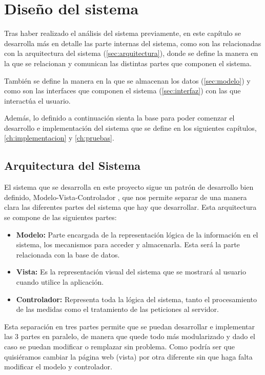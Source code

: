 \chapter{Diseño del sistema}
\label{ch:diseno}
Tras haber realizado el análisis del sistema previamente, en este capítulo se desarrolla más en detalle las parte internas del sistema, como son las relacionadas con la arquitectura del sistema (\autoref{sec:arquitectura}), donde se define la manera en la que se relacionan y comunican las distintas partes que componen el sistema. 

También se define la manera en la que se almacenan los datos (\autoref{sec:modelo}) y como son las interfaces que componen el sistema (\autoref{sec:interfaz}) con las que interactúa el usuario. 

Además, lo definido a continuación sienta la base para poder comenzar el desarrollo e implementación del sistema que se define en los siguientes capítulos, \autoref{ch:implementacion} y \autoref{ch:pruebas}.

\section{Arquitectura del Sistema}\label{sec:arquitectura}
El sistema que se desarrolla en este proyecto sigue un patrón de desarrollo bien definido, Modelo-Vista-Controlador \cite{bucanek_model-view-controller_2009}, que nos permite separar de una manera clara las diferentes partes del sistema que hay que desarrollar. Esta arquitectura se compone de las siguientes partes:
\begin{itemize}
	\item \textbf{Modelo:} Parte encargada de la representación lógica de la información en el sistema, los mecanismos para acceder y almacenarla. Esta será la parte relacionada con la base de datos.
	\item \textbf{Vista:} Es la representación visual del sistema que se mostrará al usuario cuando utilice la aplicación.
	\item \textbf{Controlador:} Representa toda la lógica del sistema, tanto el procesamiento de las medidas como el tratamiento de las peticiones al servidor.
\end{itemize}

Esta separación en tres partes permite que se puedan desarrollar e implementar las 3 partes en paralelo, de manera que quede todo más modularizado y dado el caso se puedan modificar o remplazar sin problema. Como podría ser que quisiéramos cambiar la página web (vista) por otra diferente sin que haga falta modificar el modelo y controlador. 

